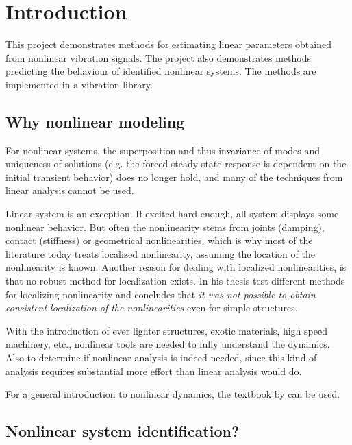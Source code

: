 \chapter{Introduction}
\label{sec:introduction}

This project demonstrates methods for estimating linear parameters obtained from
nonlinear vibration signals. The project also demonstrates methods predicting
the behaviour of identified nonlinear systems. The methods are implemented in a
vibration library.

\section{Why nonlinear modeling}
\label{sec:why-nonl-model}

For nonlinear systems, the superposition and thus invariance of modes and
uniqueness of solutions (e.g. the forced steady state response is dependent on
the initial transient behavior) does no longer hold, and many of the techniques
from linear analysis cannot be used.

Linear system is an exception. If excited hard enough, all system displays some
nonlinear behavior. But often the nonlinearity stems from joints (damping),
contact (stiffness) or geometrical nonlinearities, which is why most of the
literature today treats localized nonlinearity, assuming the location of the
nonlinearity is known.
Another reason for dealing with localized nonlinearities, is that no robust
method for localization exists. In his thesis \textcite{kragh2010a} test different
methods for localizing nonlinearity and concludes that \textit{it was not possible to
obtain consistent localization of the nonlinearities} even for simple structures.

With the introduction of ever lighter structures, exotic materials, high speed
machinery, etc., nonlinear tools are needed to fully understand the dynamics.
Also to determine if nonlinear analysis is indeed needed, since this kind of
analysis requires substantial more effort than linear analysis would do.

For a general introduction to nonlinear dynamics, the textbook by
\textcite{juel2003a} can be used.



\section{Nonlinear system identification?}
\label{sec:nonl-syst-ident}

